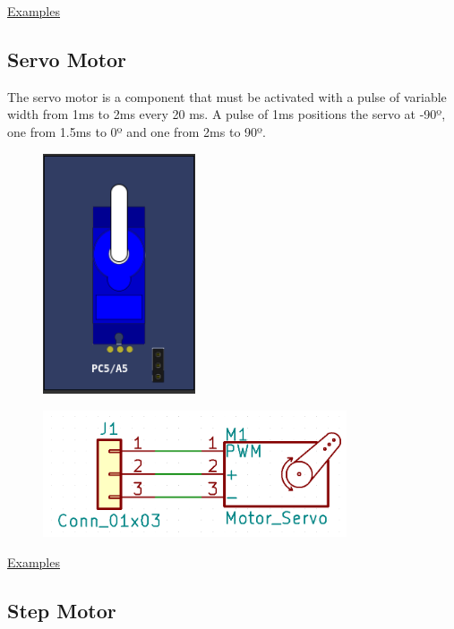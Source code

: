 \href{https://lcgamboa.github.io/picsimlab_examples/parts_RGB_LED_WS2812B.html}{Examples}

\subsection{Servo Motor}

The servo motor is a component that must be activated with a pulse of variable width from 1ms to 2ms every 20 ms.
A pulse of 1ms positions the servo at -90º, one from 1.5ms to 0º and one from 2ms to 90º.

\begin{figure}[H]
\center
\includegraphics[width=0.4\textwidth]{img/part_servo.png} 
\end{figure} 

\begin{figure}[H]
\center
\includegraphics[width=0.8\textwidth]{img/part_servo_.png} 
\end{figure} 

\href{https://lcgamboa.github.io/picsimlab_examples/parts_Servo_Motor.html}{Examples}


\subsection{Step Motor}

